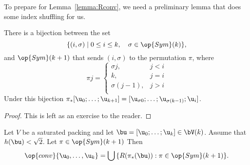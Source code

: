 To prepare for Lemma~\ref{lemma:Rconv}, we need a preliminary lemma that
does some index shuffling for us.

\begin{lemma}\label{lemma:coset-bijection}
There is a bijection between the set 
\begin{displaymath}
\{(i,\sigma)\mid 0\le i\le k,\quad \sigma\in \op{Sym}(k)\},
\end{displaymath}
and $\op{Sym}(k+1)$ 
that sends $(i,\sigma)$ to the permutation $\pi$, where
\begin{displaymath}
\pi j = \begin{cases}
\sigma j, &j<i\\
k,&j=i\\
\sigma({j-1}),&j>i\\
\end{cases}
\end{displaymath}
Under this bijection $\pi_*[\u_0;\ldots;\u_{k+1}]=[\u_{\sigma 0};\ldots;\u_{\sigma (k-1)};\u_i]$.
\end{lemma}

\begin{proof}
This is left as an exercise to the reader.
\end{proof}

\begin{lemma}\label{lemma:Rconv}  
  Let $V$ be a saturated packing and let $\bu = [\u_0;\ldots;\u_k]\in
  \bV(k)$.  Assume that $h(\bu)<\sqrt2$.  Let $\pi\in\op{Sym}(k+1)$
  Then
\begin{displaymath}
\op{conv}\{ \u_0,\ldots, \u_k\} = \bigcup \,\{ R(\pi_*(\bu)) : \pi\in \op{Sym}(k+1)\}.
\end{displaymath}
\end{lemma}
%

